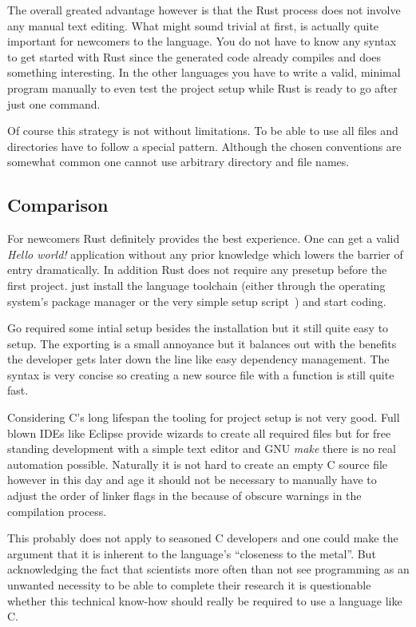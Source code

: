 The overall greated advantage however is that the Rust process does not involve any manual text editing. What might sound trivial at first, is actually quite important for newcomers to the language. You do not have to know any syntax to get started with Rust since the generated code already compiles and does something interesting. In the other languages you have to write a valid, minimal program manually to even test the project setup while Rust is ready to go after just one command.

Of course this strategy is not without limitations. To be able to use  all files and directories have to follow a special pattern. Although the chosen conventions are somewhat common one cannot use arbitrary directory and file names.


\subsection{Comparison}
\label{subsec:Implementation::Setup::Comparison}

For newcomers Rust definitely provides the best experience. One can get a valid \textit{Hello world!} application without any prior knowledge which lowers the barrier of entry dramatically. In addition Rust does not require any presetup before the first project. just install the language toolchain (either through the operating system's package manager or the very simple setup script~) and start coding.

Go required some intial setup besides the installation but it still quite easy to setup. The  exporting is a small annoyance but it balances out with the benefits the developer gets later down the line like easy dependency management. The syntax is very concise so creating a new source file with a  function is still quite fast.

Considering C's long lifespan the tooling for project setup is not very good. Full blown IDEs like Eclipse provide wizards to create all required files but for free standing development with a simple text editor and GNU \textit{make} there is no real automation possible. Naturally it is not hard to create an empty C source file however in this day and age it should not be necessary to manually have to adjust the order of linker flags in the  because of obscure warnings in the compilation process.

This probably does not apply to seasoned C developers and one could make the argument that it is inherent to the language's ``closeness to the metal''. But acknowledging the fact that scientists more often than not see programming as an unwanted necessity to be able to complete their research it is questionable whether this technical know-how should really be required to use a language like C.

